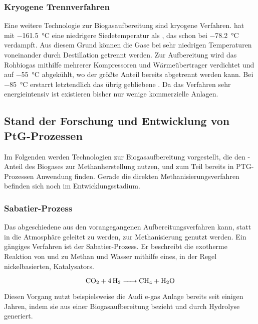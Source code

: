 \subsubsection{Kryogene Trennverfahren}\label{chap:kryo}

Eine weitere Technologie zur Biogasaufbereitung sind kryogene Verfahren.  hat mit \SI{-161,5}{\degreeCelsius} eine niedrigere Siedetemperatur als , das schon bei \SI{-78,2}{\degreeCelsius} verdampft. Aus diesem Grund können die Gase bei sehr niedrigen Temperaturen voneinander durch Destillation getrennt werden. Zur Aufbereitung wird das Rohbiogas mithilfe mehrerer Kompressoren und Wärmeübertrager verdichtet und auf \SI{-55}{\degreeCelsius} abgekühlt, wo der größte Anteil  bereits abgetrennt werden kann. Bei \SI{-85}{\degreeCelsius} erstarrt letztendlich das übrig gebliebene . Da das Verfahren sehr energieintensiv ist existieren bisher nur wenige kommerzielle Anlagen. \parencite{KGKK2019} \parencite{AONC2019} 


\subsection{Stand der Forschung und Entwicklung von PtG-Prozessen}\label{chap:SoR}

Im Folgenden werden Technologien zur Biogasaufbereitung vorgestellt, die den -Anteil des Biogases zur Methanherstellung nutzen, und zum Teil bereits in \gls{PTG}-Prozessen Anwendung finden. Gerade die direkten Methanisierungsverfahren befinden sich noch im Entwicklungsstadium.


\subsubsection{Sabatier-Prozess}\label{chap:Sabatier}

Das abgeschiedene  aus den vorangegangenen Aufbereitungsverfahren kann, statt in die Atmosphäre geleitet zu werden, zur Methanisierung genutzt werden. Ein gängiges Verfahren ist der Sabatier-Prozess. Er beschreibt die exotherme Reaktion von  und  zu Methan und Wasser mithilfe eines, in der Regel nickelbasierten, Katalysators. \parencite{AONC2019}

\begin{equation}
	\ce{CO2 + 4H2 -> CH4 + H2O}
\end{equation}

Diesen Vorgang nutzt beispielsweise die Audi e-gas Anlage bereits seit einigen Jahren, indem sie  aus einer Biogasaufbereitung bezieht und  durch Hydrolyse generiert. \parencite{AONC2019} \parencite{audi13} \smallskip

